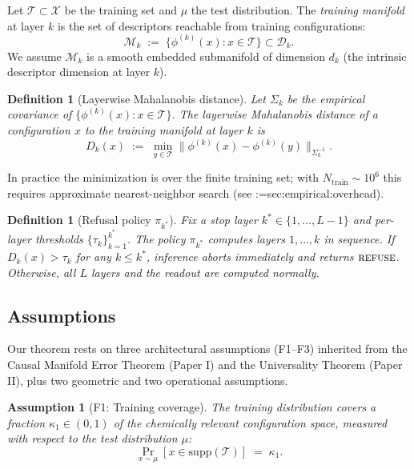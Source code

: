 \documentclass[11pt,a4paper]{article}
\makeatletter
\newcommand{\cref}[1]{\begingroup\def\crefsep{}\@for\crefitem:=#1\do{\crefsep\ref{\crefitem}\def\crefsep{, }}\endgroup}
\providecommand{\coloneqq}{\mathrel{:=}}
\newtheorem{definition}[theorem]{Definition}
\newtheorem{assumption}{Assumption}[section]
\makeatother
\begin{document}
Let $\mathcal{T}\subset\mathcal{X}$ be the training set and $\mu$ the test distribution. The \emph{training manifold} at layer $k$ is the set of descriptors reachable from training configurations:
\begin{equation}
    \mathcal{M}_k \;\coloneqq\; \{\phi^{(k)}(x) : x\in\mathcal{T}\} \subset \mathcal{D}_k.
\end{equation}
We assume $\mathcal{M}_k$ is a smooth embedded submanifold of dimension $d_k$ (the intrinsic descriptor dimension at layer $k$).

\begin{definition}[Layerwise Mahalanobis distance]
    Let $\Sigma_k$ be the empirical covariance of $\{\phi^{(k)}(x):x\in\mathcal{T}\}$. The layerwise Mahalanobis distance of a configuration $x$ to the training manifold at layer $k$ is
    \begin{equation}\label{eq:mahal}
        D_k(x) \;\coloneqq\; \min_{y\in\mathcal{T}} \bigl\|\phi^{(k)}(x) - \phi^{(k)}(y)\bigr\|_{\Sigma_k^{-1}}.
    \end{equation}
\end{definition}

In practice the minimization is over the finite training set; with $N_{\text{train}}\sim 10^6$ this requires approximate nearest-neighbor search (see \cref{sec:empirical:overhead}).

\begin{definition}[Refusal policy $\pi_{k^*}$]
    Fix a stop layer $k^*\in\{1,\dots,L-1\}$ and per-layer thresholds $\{\tau_k\}_{k=1}^{k^*}$. The policy $\pi_{k^*}$ computes layers $1,\dots,k$ in sequence. If $D_k(x)>\tau_k$ for any $k\le k^*$, inference aborts immediately and returns $\textsc{refuse}$. Otherwise, all $L$ layers and the readout are computed normally.
\end{definition}

\subsection{Assumptions}\label{sec:assumptions}

Our theorem rests on three architectural assumptions (F1--F3) inherited from the Causal Manifold Error Theorem (Paper I) and the Universality Theorem (Paper II), plus two geometric and two operational assumptions.

\begin{assumption}[F1: Training coverage]\label{ass:f1}
    The training distribution covers a fraction $\kappa_1\in(0,1)$ of the chemically relevant configuration space, measured with respect to the test distribution $\mu$:
    \begin{equation}
        \Pr_{x\sim\mu}[x\in\text{supp}(\mathcal{T})] \;=\; \kappa_1.
    \end{equation}
\end{assumption}
\end{document}

